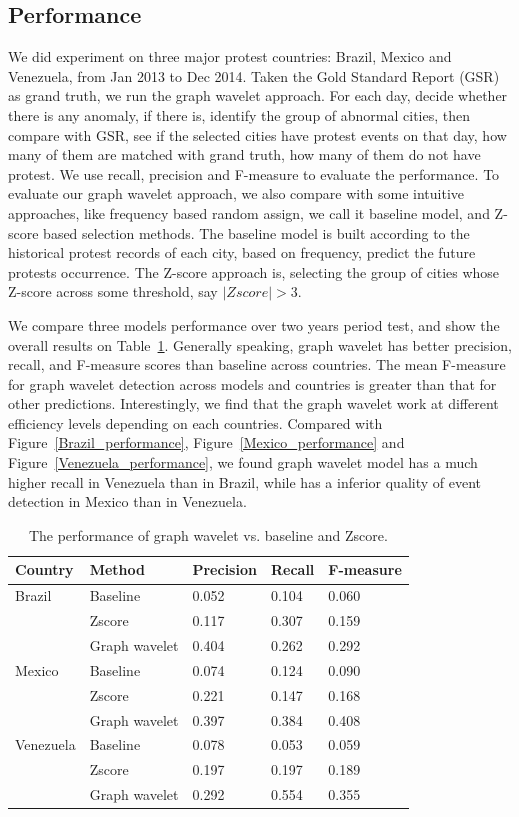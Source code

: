 \documentclass[conference]{IEEEtran}
\begin{document}
\subsection{Performance}
We did experiment on three major protest countries: Brazil, Mexico and Venezuela, from Jan 2013 to Dec 2014. Taken the Gold Standard Report (GSR) as grand truth, we run the graph wavelet approach. For each day, decide whether there is any anomaly, if there is, identify the group of abnormal cities, then compare with GSR, see if the selected cities have protest events on that day, how many of them are matched with grand truth, how many of them do not have protest. We use recall, precision and F-measure to evaluate the performance.
To evaluate our graph wavelet approach, we also compare with some intuitive approaches, like frequency based random assign, we call it baseline model, and Z-score based selection methods. The baseline model is built according to the historical protest records of each city, based on frequency, predict the future protests occurrence. The Z-score approach is, selecting the group of cities whose Z-score across some threshold, say $|Zscore|>3$.

We compare three models performance over two years period test, and show the overall results on Table~\ref{table:models_compare}. Generally speaking, graph wavelet has better precision, recall, and F-measure scores than baseline across countries. The mean F-measure for graph wavelet detection across models and countries is greater than that for other predictions. Interestingly, we find that the graph wavelet work at different efficiency levels depending on each countries. Compared with Figure~\ref{Brazil_performance}, Figure~\ref{Mexico_performance} and Figure~\ref{Venezuela_performance}, we found graph wavelet model has a much higher recall in Venezuela than in Brazil, while has a inferior quality of event detection in Mexico than in Venezuela.


\begin{table}[bth] %
\renewcommand{\arraystretch}{1.1}
\caption{\label{table:models_compare} The performance of graph wavelet vs. baseline and Zscore.}
\scriptsize
\centering
\begin{tabular}{ l | l |l | l | l}
\hline
\textbf{Country} & \textbf{Method}& \textbf{Precision}  & \textbf{Recall}  & \textbf{F-measure} \\
\hline
Brazil & Baseline & 0.052 &0.104 & 0.060\\
       & Zscore & 0.117&0.307 & 0.159 \\
 & Graph wavelet& 0.404 &0.262 & 0.292 \\
\hline
Mexico & Baseline & 0.074 &0.124 & 0.090 \\
       & Zscore & 0.221 &0.147 & 0.168 \\
 & Graph wavelet& 0.397 &0.384 & 0.408 \\
\hline
Venezuela & Baseline & 0.078 &0.053 & 0.059 \\
       & Zscore & 0.197 &0.197 & 0.189 \\
 & Graph wavelet& 0.292 &0.554 & 0.355 \\
\hline
\end{tabular}
\end{table}
\end{document}
